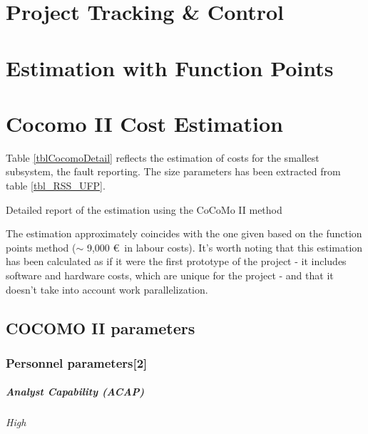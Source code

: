 \documentclass[11pt]{report}
\begin{document}
\chapter{Project Tracking \& Control}
\label{chapTracking}


\appendix

\chapter{Estimation with Function Points}
\label{chapFunctionPoints}


\chapter{Cocomo II Cost Estimation}
\label{chapCocomo}

Table \ref{tblCocomoDetail} reflects the estimation of costs for the smallest subsystem, the fault reporting. The size parameters has been extracted from table \ref{tbl_RSS_UFP}.

\begin{table}[hbtp]
\centering

\caption{Detailed report of the estimation using the CoCoMo II method}
\label{tblCocomoDetail}
\end{table}

The estimation approximately coincides with the one given based on the function points method ($\sim$ 9,000 \euro\ in labour costs). It's worth noting that this estimation has been calculated as if it were the first prototype of the project - it includes software and hardware costs, which are unique for the project - and that it doesn't take into account work parallelization.

\section{COCOMO II parameters}




\subsection{Personnel parameters[2]}
\paragraph{Analyst Capability (ACAP) } \textit{High}
\end{document}
